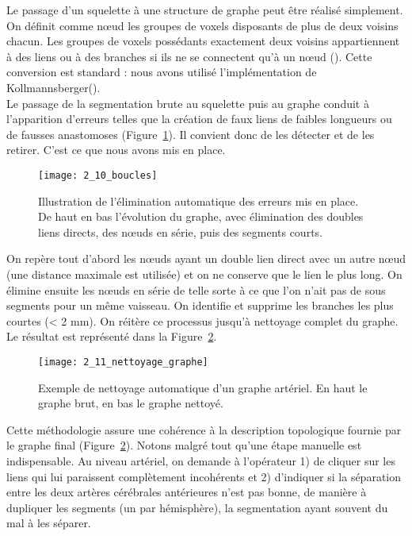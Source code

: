Le passage d’un squelette à une structure de graphe peut être réalisé simplement. On définit comme nœud les groupes de voxels disposants de plus de deux voisins chacun. Les groupes de voxels possédants exactement deux voisins appartiennent à des liens ou à des branches si ils ne se connectent qu’à un nœud (\cite{Kerschnitzki2013}). Cette conversion est standard : nous avons utilisé l’implémentation de Kollmannsberger(\cite{Kerschnitzki2013}). \\

Le passage de la segmentation brute au squelette puis au graphe conduit à l’apparition d’erreurs telles que la création de faux liens de faibles longueurs ou de fausses anastomoses (Figure~\ref{fig:2_10_boucles}). Il convient donc de les détecter et de les retirer. C’est ce que nous avons mis en place.
\begin{figure}[!b]
\centering
\texttt{[image: 2\_10\_boucles]}
\caption{Illustration de l'élimination automatique des erreurs mis en place. De haut en bas l’évolution du graphe, avec élimination des doubles liens directs, des nœuds en série, puis des segments courts.}
\label{fig:2_10_boucles}	
\end{figure}	
On repère tout d’abord les nœuds ayant un double lien direct avec un autre nœud (une distance maximale est utilisée) et on ne conserve que le lien le plus long. On élimine ensuite les nœuds en série de telle sorte à ce que l’on n’ait pas de sous segments pour un même vaisseau. On identifie et supprime les branches les plus courtes (< 2 mm). On réitère ce processus jusqu’à nettoyage complet du graphe. Le résultat est représenté dans la Figure~\ref{fig:2_11_nettoyage_graphe}.\\
\begin{figure}[!t]
\centering
\texttt{[image: 2\_11\_nettoyage\_graphe]}
\caption{Exemple de nettoyage automatique d'un graphe artériel. En haut le graphe brut, en bas le graphe nettoyé.}
\label{fig:2_11_nettoyage_graphe}	
\end{figure}	

Cette méthodologie assure une cohérence à la description topologique fournie par le graphe final (Figure~\ref{fig:2_11_nettoyage_graphe}). Notons malgré tout qu’une étape manuelle est indispensable. Au niveau artériel, on demande à l’opérateur 1) de cliquer sur les liens qui lui paraissent complètement incohérents et 2) d’indiquer si la séparation entre les deux artères cérébrales antérieures n’est pas bonne, de manière à dupliquer les segments (un par hémisphère), la segmentation ayant souvent du mal à les séparer.\\

